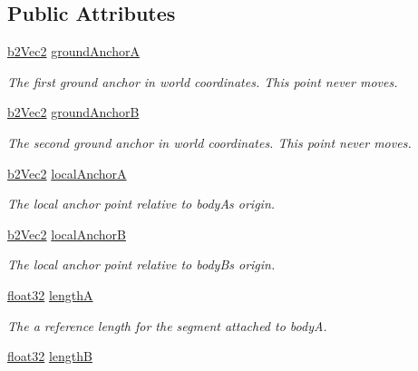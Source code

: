 \subsection*{Public Attributes}
\begin{DoxyCompactItemize}
\item 
\mbox{\hyperlink{structb2_vec2}{b2\+Vec2}} \mbox{\hyperlink{structb2_pulley_joint_def_aae77c020ce4629ab9e03560e28aa853d}{ground\+AnchorA}}
\begin{DoxyCompactList}\small\item\em The first ground anchor in world coordinates. This point never moves. \end{DoxyCompactList}\item 
\mbox{\hyperlink{structb2_vec2}{b2\+Vec2}} \mbox{\hyperlink{structb2_pulley_joint_def_aa412b9f3bffd1fb69ace14f9b3e03b82}{ground\+AnchorB}}
\begin{DoxyCompactList}\small\item\em The second ground anchor in world coordinates. This point never moves. \end{DoxyCompactList}\item 
\mbox{\hyperlink{structb2_vec2}{b2\+Vec2}} \mbox{\hyperlink{structb2_pulley_joint_def_ad7677a4ad02a6e7cb8699fc5012eac3e}{local\+AnchorA}}
\begin{DoxyCompactList}\small\item\em The local anchor point relative to bodyA\textquotesingle{}s origin. \end{DoxyCompactList}\item 
\mbox{\hyperlink{structb2_vec2}{b2\+Vec2}} \mbox{\hyperlink{structb2_pulley_joint_def_aed3f9c9f5f4145ceb32e7e164de73144}{local\+AnchorB}}
\begin{DoxyCompactList}\small\item\em The local anchor point relative to bodyB\textquotesingle{}s origin. \end{DoxyCompactList}\item 
\mbox{\hyperlink{b2_settings_8h_aacdc525d6f7bddb3ae95d5c311bd06a1}{float32}} \mbox{\hyperlink{structb2_pulley_joint_def_a51d945882c1d7a78af2b0e9ffb31a33b}{lengthA}}
\begin{DoxyCompactList}\small\item\em The a reference length for the segment attached to bodyA. \end{DoxyCompactList}\item 
\mbox{\hyperlink{b2_settings_8h_aacdc525d6f7bddb3ae95d5c311bd06a1}{float32}} \mbox{\hyperlink{structb2_pulley_joint_def_a5857d5b5b9880b6c8201ce3ee8c3eef0}{lengthB}}

\end{DoxyCompactItemize}
